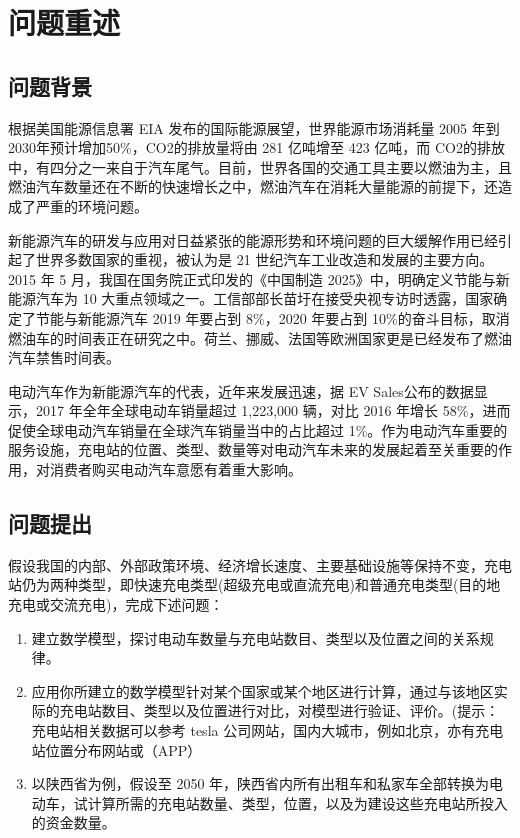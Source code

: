 \documentclass[12pt]{cumcmart}   %
\begin{document}
\newpage
 \setcounter{page}{1}
\pagestyle{fancy} 
\section{问题重述}
\subsection{问题背景}
根据美国能源信息署 EIA 发布的国际能源展望，世界能源市场消耗量 2005 年到 2030年预计增加50\%，CO2的排放量将由 281 亿吨增至 423 亿吨，而 CO2的排放中，有四分之一来自于汽车尾气。目前，世界各国的交通工具主要以燃油为主，且燃油汽车数量还在不断的快速增长之中，燃油汽车在消耗大量能源的前提下，还造成了严重的环境问题。

 新能源汽车的研发与应用对日益紧张的能源形势和环境问题的巨大缓解作用已经引起了世界多数国家的重视，被认为是 21 世纪汽车工业改造和发展的主要方向。2015 年 5 月，我国在国务院正式印发的《中国制造 2025》中，明确定义节能与新能源汽车为 10 大重点领域之一。工信部部长苗圩在接受央视专访时透露，国家确定了节能与新能源汽车 2019 年要占到 8\%，2020 年要占到 10\%的奋斗目标，取消燃油车的时间表正在研究之中。荷兰、挪威、法国等欧洲国家更是已经发布了燃油汽车禁售时间表。 
 
 电动汽车作为新能源汽车的代表，近年来发展迅速，据 EV Sales公布的数据显示，2017 年全年全球电动车销量超过 1,223,000 辆，对比 2016 年增长 58\%，进而促使全球电动汽车销量在全球汽车销量当中的占比超过 1\%。作为电动汽车重要的服务设施，充电站的位置、类型、数量等对电动汽车未来的发展起着至关重要的作用，对消费者购买电动汽车意愿有着重大影响。 
 
 


\subsection{问题提出}
假设我国的内部、外部政策环境、经济增长速度、主要基础设施等保持不变，充电站仍为两种类型，即快速充电类型(超级充电或直流充电)和普通充电类型(目的地充电或交流充电)，完成下述问题： 

\begin{enumerate}
	\item 建立数学模型，探讨电动车数量与充电站数目、类型以及位置之间的关系规律。
	\item 应用你所建立的数学模型针对某个国家或某个地区进行计算，通过与该地区实际的充电站数目、类型以及位置进行对比，对模型进行验证、评价。(提示：充电站相关数据可以参考 tesla 公司网站，国内大城市，例如北京，亦有充电站位置分布网站或（APP） 
	\item 以陕西省为例，假设至 2050 年，陕西省内所有出租车和私家车全部转换为电动车，试计算所需的充电站数量、类型，位置，以及为建设这些充电站所投入的资金数量。 
\end{enumerate}
\end{document}
